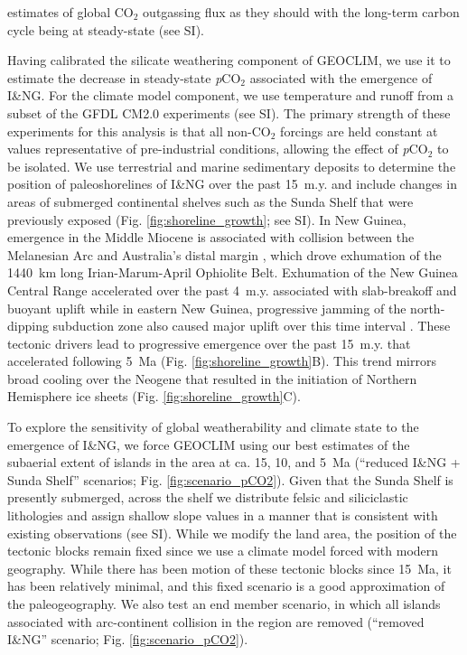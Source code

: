 \documentclass[11pt,letterpaper]{article}
\newcommand{\pCOtwo}{\textit{p}CO$_{2}$\xspace}
\newcommand{\COtwo}{CO$_{2}$\xspace}
\begin{document}
estimates of global \COtwo outgassing flux \cite{Gerlach2011a} as they should with the long-term carbon cycle being at steady-state (see SI).

Having calibrated the silicate weathering component of GEOCLIM, we use it to estimate the decrease in steady-state \pCOtwo associated with the emergence of I\&NG. For the climate model component, we use temperature and runoff from a subset of the GFDL CM2.0 experiments \cite{Delworth2006a, Delworth2006b} (see SI). The primary strength of these experiments for this analysis is that all non-\COtwo forcings are held constant at values representative of pre-industrial conditions, allowing the effect of \pCOtwo to be isolated. We use terrestrial and marine sedimentary deposits to determine the position of paleoshorelines of I\&NG over the past 15~m.y. and include changes in areas of submerged continental shelves such as the Sunda Shelf that were previously exposed (Fig. \ref{fig:shoreline_growth}; see SI). In New Guinea, emergence in the Middle Miocene is associated with collision between the Melanesian Arc and Australia's distal margin \cite{vanUfford2005a, Cloos2005a, Baldwin2012a}, which drove exhumation of the 1440~km long Irian-Marum-April Ophiolite Belt. Exhumation of the New Guinea Central Range accelerated over the past 4~m.y. associated with slab-breakoff and buoyant uplift \cite{Cloos2005a} while in eastern New Guinea, progressive jamming of the north-dipping subduction zone also caused major uplift over this time interval \cite{vanUfford2005a}. These tectonic drivers lead to progressive emergence over the past 15~m.y. that accelerated following 5~Ma (Fig. \ref{fig:shoreline_growth}B). This trend mirrors broad cooling over the Neogene that resulted in the initiation of Northern Hemisphere ice sheets (Fig. \ref{fig:shoreline_growth}C).

To explore the sensitivity of global weatherability and climate state to the emergence of I\&NG, we force GEOCLIM using our best estimates of the subaerial extent of islands in the area at ca. 15, 10, and 5~Ma (``reduced I\&NG + Sunda Shelf'' scenarios; Fig. \ref{fig:scenario_pCO2}). Given that the Sunda Shelf is presently submerged, across the shelf we distribute felsic and siliciclastic lithologies and assign shallow slope values in a manner that is consistent with existing observations (see SI). While we modify the land area, the position of the tectonic blocks remain fixed since we use a climate model forced with modern geography. While there has been motion of these tectonic blocks since 15~Ma, it has been relatively minimal, and this fixed scenario is a good approximation of the paleogeography. We also test an end member scenario, in which all islands associated with arc-continent collision in the region are removed (``removed I\&NG'' scenario; Fig. \ref{fig:scenario_pCO2}).
\end{document}
